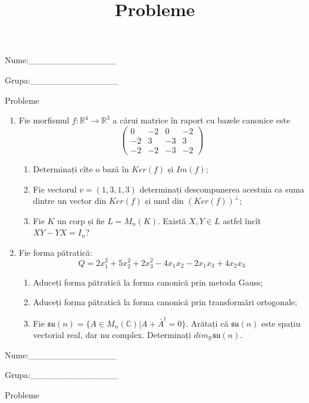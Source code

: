 \documentclass{article}
\title{Probleme}
\author{ }
\date{ }
\begin{document}
\begin{flushright}
Nume:\_\_\_\_\_\_\_\_\_\_\_\_\_\_
 
 
Grupa:\_\_\_\_\_\_\_\_\_\_\_\_\_\_
\end{flushright}
\begin{center}
\vspace{2cm}
{\Large Probleme}
\vspace{2cm}
\end{center}
\begin{enumerate}
 \item Fie morfismul $f:\mathbb{R}^4 \to \mathbb{R}^3$ a cărui matrice în raport cu bazele canonice este
$$\begin{pmatrix}
0&-2&0&-2\\
-2&3&-3&3\\
-2&-2&-3&-2
\end{pmatrix}$$

\begin{enumerate}
\item Determinați cîte o bază în $Ker(f)$ și $Im(f)$;
\item Fie vectorul $v=(1,3,1,3)$ determinați descompunerea acestuia ca suma dintre un vector din $Ker(f)$ și unul din $(Ker(f))^\perp$;
\item Fie $K$ un corp și fie $L=M_n(K)$. Există $X,Y \in L$ astfel încît $XY-YX=I_n$?  
\end{enumerate}
\item Fie forma pătratică:
$$Q= 2x_1^2+5x_2^2+2x_3^2-4x_1x_2-2x_1x_3+4x_2x_3$$

\begin{enumerate}
\item Aduceți forma pătratică la forma canonică prin metoda Gauss;
\item Aduceți forma pătratică la forma canonică prin transformări ortogonale;
\item Fie $\mathfrak{su}(n)=\{ A \in M_n(\mathbb{C}) | A+\bar{A}^t=0\}$. Arătați că $\mathfrak{su}(n)$ este spațiu vectorial real, dar nu complex.
Determinați $dim_{\mathbb{R}}\mathfrak{su}(n)$.
\end{enumerate}
\end{enumerate}
\newpage
\begin{flushright}
Nume:\_\_\_\_\_\_\_\_\_\_\_\_\_\_
 
 
Grupa:\_\_\_\_\_\_\_\_\_\_\_\_\_\_
\end{flushright}
\begin{center}
\vspace{2cm}
{\Large Probleme}
\vspace{2cm}
\end{center}
\end{document}
